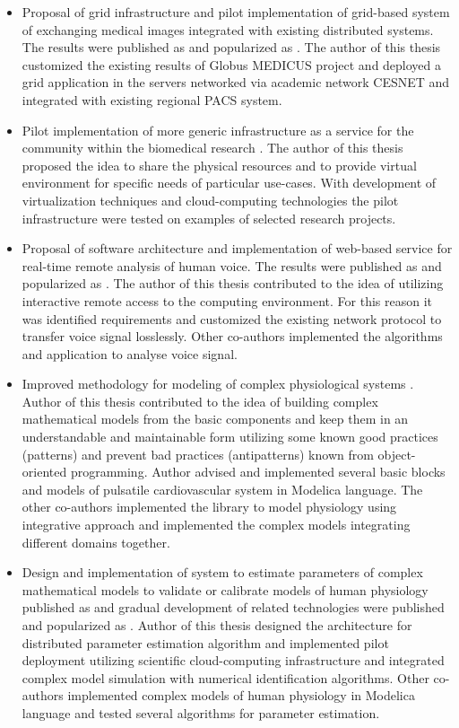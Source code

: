 \begin{itemize}
\item Proposal of grid infrastructure and pilot implementation of grid-based system of exchanging medical images integrated with existing distributed systems. The results were published as \cite{kulhanek2009} and popularized as \cite{Kulhanek2008Mefanet,Sarek2009,kulhanek2009dd}. The author of this thesis customized the existing results of Globus MEDICUS project and deployed a grid application in the servers networked via academic network CESNET and integrated with existing regional PACS system. 
\item Pilot implementation of more generic infrastructure as a service for the community within the biomedical research \cite{kulhanek2010c, kulhanek2011dd}. The author of this thesis proposed the idea to share the physical resources and to provide virtual environment for specific needs of particular use-cases. With development of virtualization techniques and cloud-computing technologies the pilot infrastructure were tested on examples of selected research projects.
\item Proposal of software architecture and implementation of web-based service for real-time remote analysis of human voice. The results were published as \cite{kulhanek2010b} and popularized as \cite{Kulhanek2010d, Kulhanek2012}. The author of this thesis contributed to the idea of utilizing interactive remote access to the computing environment. For this reason it was identified requirements and customized the existing network protocol to transfer voice signal losslessly. Other co-authors implemented the algorithms and application to analyse voice signal.
\item Improved methodology for modeling of complex physiological systems \cite{Kulhanek2014Modeling, Kulhanek2014mefanet, Matejak2014, kofranek2013hummod}. Author of this thesis contributed to the idea of building complex  mathematical models from the basic components and keep them in an understandable and maintainable form utilizing some known good practices (patterns) and prevent bad practices (antipatterns) known from object-oriented programming. Author advised and implemented several basic blocks and models of pulsatile cardiovascular system in Modelica language. The other co-authors implemented the library to model physiology using integrative approach and implemented the complex models integrating different domains together.
\item Design and implementation of system to estimate parameters of complex mathematical models to validate or calibrate models of human physiology published as \cite{Kulhanek2014Parameters} and gradual development of related technologies were published and popularized as \cite{Kulhanek2010, Kulhanek2013c, Kulhanek2011, Kulhanek2014}. Author of this thesis designed the architecture for distributed parameter estimation algorithm and implemented pilot deployment utilizing scientific cloud-computing infrastructure and integrated complex model simulation with numerical identification algorithms. Other co-authors implemented complex models of human physiology in Modelica language and tested several algorithms for parameter estimation.

\end{itemize}

